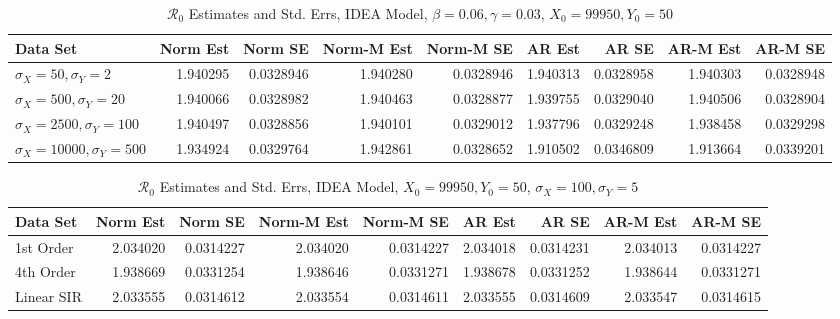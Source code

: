\documentclass[12pt]{article}
\newcommand{\rr}{\ensuremath{\mathcal{R}_0}}
\begin{document}
\begin{table}[H]
	
	\caption{\label{tab:}$\rr$ Estimates and Std. Errs, IDEA Model,
		$\beta = 0.06, \gamma = 0.03$, $X_0 = 99950, Y_0 = 50$}
	\centering
	\begin{tabular}[t]{l|r|r|r|r|r|r|r|r}
		\hline
		Data Set & Norm Est & Norm SE & Norm-M Est & Norm-M SE & AR Est & AR SE & AR-M Est & AR-M SE\\
		\hline
		$\sigma_X = 50, \sigma_Y = 2$ & 1.940295 & 0.0328946 & 1.940280 & 0.0328946 & 1.940313 & 0.0328958 & 1.940303 & 0.0328948\\
		\hline
		$\sigma_X = 500, \sigma_Y = 20$ & 1.940066 & 0.0328982 & 1.940463 & 0.0328877 & 1.939755 & 0.0329040 & 1.940506 & 0.0328904\\
		\hline
		$\sigma_X = 2500, \sigma_Y = 100$ & 1.940497 & 0.0328856 & 1.940101 & 0.0329012 & 1.937796 & 0.0329248 & 1.938458 & 0.0329298\\
		\hline
		$\sigma_X = 10000, \sigma_Y = 500$ & 1.934924 & 0.0329764 & 1.942861 & 0.0328652 & 1.910502 & 0.0346809 & 1.913664 & 0.0339201\\
		\hline
	\end{tabular}
\end{table}

\begin{table}[H]
	
	\caption{\label{tab:}$\rr$ Estimates and Std. Errs, IDEA Model,
		$X_0 = 99950, Y_0 = 50$, $\sigma_X = 100, \sigma_Y = 5$}
	\centering
	\begin{tabular}[t]{l|r|r|r|r|r|r|r|r}
		\hline
		Data Set & Norm Est & Norm SE & Norm-M Est & Norm-M SE & AR Est & AR SE & AR-M Est & AR-M SE\\
		\hline
		1st Order & 2.034020 & 0.0314227 & 2.034020 & 0.0314227 & 2.034018 & 0.0314231 & 2.034013 & 0.0314227\\
		\hline
		4th Order & 1.938669 & 0.0331254 & 1.938646 & 0.0331271 & 1.938678 & 0.0331252 & 1.938644 & 0.0331271\\
		\hline
		Linear SIR & 2.033555 & 0.0314612 & 2.033554 & 0.0314611 & 2.033555 & 0.0314609 & 2.033547 & 0.0314615\\
		\hline
	\end{tabular}
\end{table}
\end{document}
